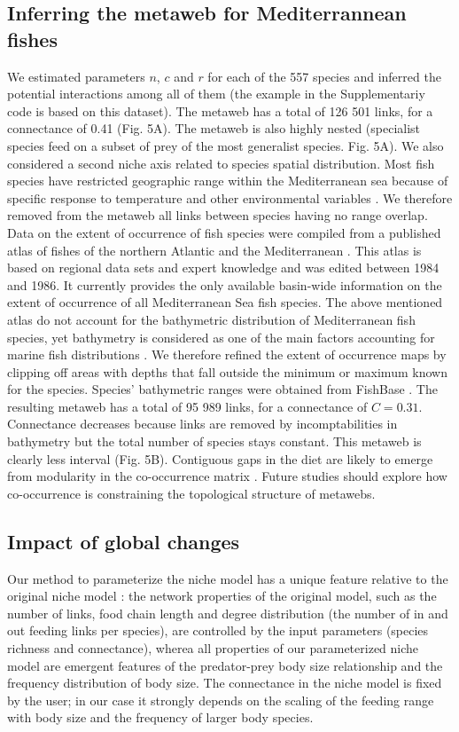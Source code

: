 \documentclass[12pt]{article}
\begin{document}
\subsection{Inferring the metaweb for Mediterrannean fishes}
We estimated parameters $n$, $c$ and $r$ for each of the 557 species and inferred the potential interactions among all of them (the example in the Supplementariy code is based on this dataset). The metaweb has a total of 126 501 links, for a connectance of 0.41 (Fig. 5A). The metaweb is also highly nested (specialist species feed on a subset of prey of the most generalist species. Fig. 5A). We also considered a second niche axis related to species spatial distribution. Most fish species have restricted geographic range within the Mediterranean sea because of specific response to temperature and other environmental variables \parencite{Albouy2012}. We therefore removed from the metaweb all links between species having no range overlap. Data on the extent of occurrence of fish species were compiled from a published atlas of fishes of the northern Atlantic and the Mediterranean \parencite{Whitehead1986}. This atlas is based on regional data sets and expert knowledge and was edited between 1984 and 1986. It currently provides the only available basin-wide information on the extent of occurrence of all Mediterranean Sea fish species. The above mentioned atlas do not account for the bathymetric distribution of Mediterranean fish species, yet bathymetry is considered as one of the main factors accounting for marine fish distributions \parencite{Louisy2005}. We therefore refined the extent of occurrence maps by clipping off areas with depths that fall outside the minimum or maximum known for the species. Species' bathymetric ranges were obtained from FishBase \parencite{Froese2010, Louisy2005}. The resulting metaweb has a total of 95 989 links, for a connectance of $C = 0.31$. Connectance decreases because links are removed by incomptabilities in bathymetry but the total number of species stays constant. This metaweb is clearly less interval (Fig. 5B). Contiguous gaps in the diet are likely to emerge from modularity in the co-occurrence matrix \parencite{Araujo2011}. Future studies should explore how co-occurrence is constraining the topological structure of metawebs. 

\subsection{Impact of global changes}
Our method to parameterize the niche model has a unique feature relative to the original niche model \parencite{Williams2000}: the network properties of the original model, such as the number of links, food chain length and degree distribution (the number of in and out feeding links per species), are controlled by the input parameters (species richness and connectance), wherea all properties of our parameterized niche model are emergent features of the predator-prey body size relationship and the frequency distribution of body size. The connectance in the niche model is fixed by the user; in our case it strongly depends on the scaling of the feeding range with body size and the frequency of larger body species. 
\end{document}

